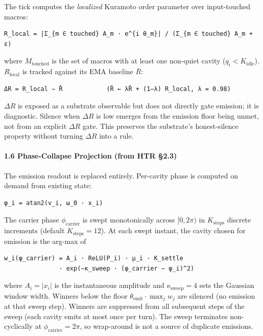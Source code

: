\documentclass[
  11pt,
  a4paper,
]{article}
\begin{document}
The tick computes the \emph{localized} Kuramoto order parameter over
input-touched macros:

\begin{verbatim}
R_local = |Σ_{m ∈ touched} A_m · e^{i θ_m}| / (Σ_{m ∈ touched} A_m + ε)
\end{verbatim}

where \(M_{\text{touched}}\) is the set of macros with at least one
non-quiet cavity (\(q_i < K_{\text{idle}}\)). \(R_{\text{local}}\) is
tracked against its EMA baseline \(\bar R\):

\begin{verbatim}
ΔR = R_local − R̄            (R̄ ← λR̄ + (1−λ) R_local, λ = 0.98)
\end{verbatim}

\(\Delta R\) is exposed as a substrate observable but does not directly
gate emission; it is diagnostic. Silence when \(\Delta R\) is low
emerges from the emission floor being unmet, not from an explicit
\(\Delta R\) gate. This preserves the substrate's honest-silence
property without turning \(\Delta R\) into a rule.

\paragraph{1.6 Phase-Collapse Projection (from HTR
§2.3)}\label{phase-collapse-projection-from-htr-2.3}

The emission readout is replaced entirely. Per-cavity phase is computed
on demand from existing state:

\begin{verbatim}
φ_i = atan2(v_i, ω_0 · x_i)
\end{verbatim}

The carrier phase \(\phi_{\text{carrier}}\) is swept monotonically
across \([0, 2\pi)\) in \(K_{\text{steps}}\) discrete increments
(default \(K_{\text{steps}} = 12\)). At each swept instant, the cavity
chosen for emission is the arg-max of

\begin{verbatim}
w_i(φ_carrier) = A_i · ReLU(P_i) · μ_i · K_settle
               · exp(−κ_sweep · (φ_carrier − φ_i)^2)
\end{verbatim}

where \(A_i = |x_i|\) is the instantaneous amplitude and
\(\kappa_{\text{sweep}} = 4\) sets the Gaussian window width. Winners
below the floor \(\theta_{\text{emit}} \cdot \max_j w_j\) are silenced
(no emission at that sweep step). Winners are suppressed from all
subsequent steps of the sweep (each cavity emits at most once per turn).
The sweep terminates non-cyclically at \(\phi_{\text{carrier}} = 2\pi\),
so wrap-around is not a source of duplicate emissions.
\end{document}
